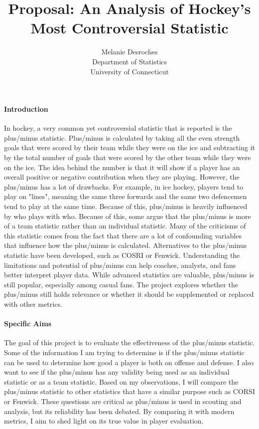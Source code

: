 \documentclass[12pt]{article}
\title{Proposal: An Analysis of Hockey's Most Controversial Statistic}
\author{Melanie Desroches\\
  Department of Statistics\\
  University of Connecticut
}
\begin{document}
\maketitle


\paragraph{Introduction}
In hockey, a very common yet controversial statistic that is reported is the plus/minus statistic. Plus/minus is 
calculated by taking all the even strength goals that were scored by their team while they were on the ice and 
subtracting it by the total number of goals that were scored by the other team while they were on the ice. The 
idea behind the number is that it will show if a player has an overall positive or negative contribution when 
they are playing. However, the plus/minus has a lot of drawbacks. For example, in ice hockey, players tend to play 
on "lines", meaning the same three forwards and the same two defencemen tend to play at the same time. Because of this, 
plus/minus is heavily influenced by who plays with who. Because of this, some argue that the plus/minus is more of a team 
statistic rather than an individual statistic. Many of the criticisms of this statistic comes from the fact that
there are a lot of confounding variables that influence how the plus/minus is calculated. Alternatives to the plus/minus 
statistic have been developed, such as COSRI or Fenwick. Understanding the limitations and potential of plus/minus can 
help coaches, analysts, and fans better interpret player data. While advanced statistics are valuable, plus/minus is still 
popular, especially among casual fans. The project explores whether the plus/minus still holds relevance or whether it should 
be supplemented or replaced with other metrics.


\paragraph{Specific Aims}
The goal of this project is to evaluate the effectiveness of the plus/minus statistic. Some of the information
I am trying to determine is if the plus/minus statistic can be used to determine how good a player is both on
offense and defense. I also want to see if the plus/minus has any validity being used as an individual
statistic or as a team statistic. Based on my observations, I will compare the plus/minus statistic to other
statistics that have a similar purpose such as CORSI or Fenwick.
These questions are critical as plus/minus is used in scouting and analysis, but its reliability 
has been debated. By comparing it with modern metrics, I aim to shed light on its true value in player evaluation.
\end{document}
